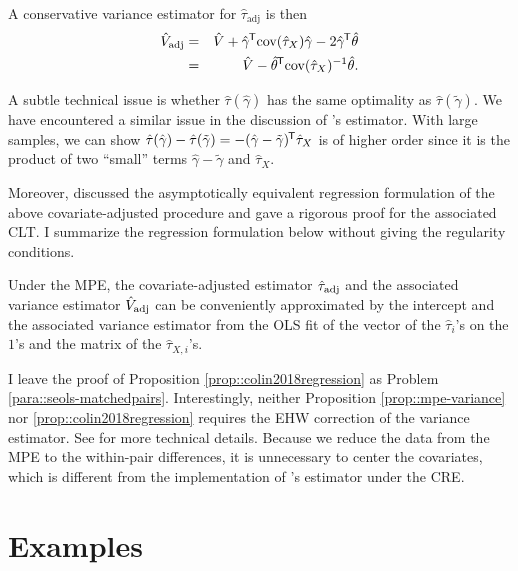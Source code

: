 A conservative variance estimator for $\hat{\tau}_{\text{adj}} $ is then
\begin{eqnarray*}
\hat{V} _{\text{adj}} 
&=& 
\hat{V} + \hat \gamma^{\mkern-1.5mu\mathsf{T}} \textup{cov}(\hat{\tau}_X   ) \hat \gamma - 2 \hat \gamma^{\mkern-1.5mu\mathsf{T}} \hat \theta  \\
&=& \hat{V}  - \hat \theta ^{\mkern-1.5mu\mathsf{T}} \textup{cov}(\hat{\tau}_X   ) ^{-1}    \hat \theta .
\end{eqnarray*}


A subtle technical issue is whether $\hat\tau(\hat\gamma)$ has the same optimality as $\hat\tau(\tilde\gamma)$. We have encountered a similar issue in the discussion of \citet{lin2013}'s estimator. 
With large samples, we can show $\hat\tau(\hat\gamma) - \hat\tau(\tilde\gamma) =  - (\hat\gamma - \tilde\gamma)^{\mkern-1.5mu\mathsf{T}} \hat{\tau}_X $ is of higher order since it is the product of two ``small'' terms   $\hat\gamma - \tilde\gamma$ and $\hat{\tau}_X$. 


Moreover,  \citet{fogarty2018regression} discussed the asymptotically equivalent regression formulation of the above covariate-adjusted procedure and gave a rigorous proof for the associated CLT. I summarize the regression formulation below without giving the regularity conditions. 


\begin{proposition}\label{prop::colin2018regression}
Under the MPE, the covariate-adjusted estimator $\hat{\tau}_{\textup{adj}} $ and the associated variance estimator $\hat{V} _{\textup{adj}}$ can be conveniently approximated by the intercept and the associated variance estimator from the OLS fit of the vector of the $\hat{\tau}_i $'s on the $1$'s and the matrix of the $\hat{\tau}_{X,i} $'s. 
\end{proposition}


I leave the proof of Proposition \ref{prop::colin2018regression} as Problem \ref{para::seols-matchedpairs}. Interestingly, neither Proposition \ref{prop::mpe-variance} nor \ref{prop::colin2018regression} requires the EHW correction of the variance estimator. See \citet{fogarty2018regression} for more technical details.  Because we reduce the data from the MPE to the within-pair differences, it is unnecessary to center the covariates, which is different from the implementation of \citet{lin2013}'s estimator under the CRE.

 


\section{Examples}

